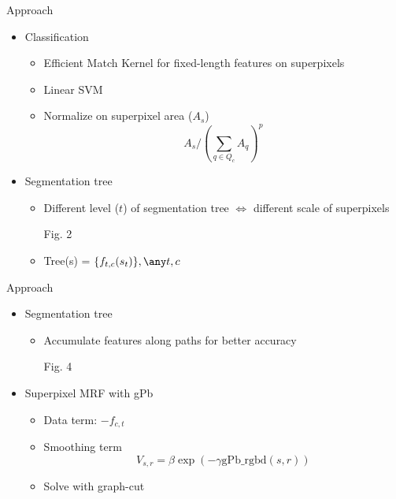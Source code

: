 \documentclass[12pt]{beamer}
\begin{document}
\begin{frame}{Approach}
	\begin{itemize}
		\item Classification
		\begin{itemize}
			\item Efficient Match Kernel for fixed-length features on superpixels
			\item Linear SVM
			\item Normalize on superpixel area ($A_s$)
			\[A_s / (\sum_{q\in Q_c}A_q)^p\]
		\end{itemize}
		\item Segmentation tree
		\begin{itemize}
			\item Different level ($t$) of segmentation tree $\Leftrightarrow$ different scale of superpixels
			\item [Fig. 2]
			\item Tree(s) = $\{f_{t, c}(s_t)\}, \any t, c$
		\end{itemize}
	\end{itemize}
\end{frame}

\begin{frame}{Approach}
	\begin{itemize}
		\item Segmentation tree
		\begin{itemize}
			\item Accumulate features along paths for better accuracy
			\item [Fig. 4]
		\end{itemize}
		\item Superpixel MRF with gPb
		\begin{itemize}
			\item Data term: $-f_{c, t}$
			\item Smoothing term
			\[V_{s, r} = \beta \exp(-\gamma \text{gPb_rgbd}(s, r))\]
			\item Solve with graph-cut
		\end{itemize}
	\end{itemize}
\end{frame}
\end{document}
